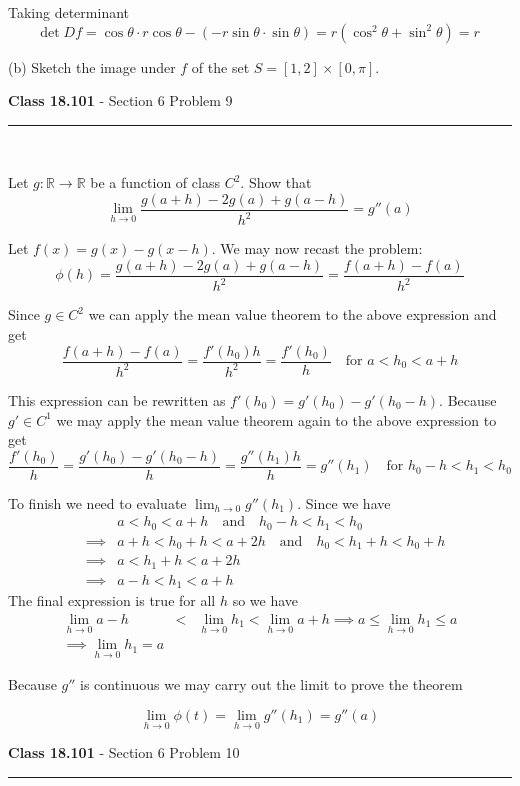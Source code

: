 \documentclass[11pt,reqno]{article}
\begin{document}
\noindent Taking determinant
\[ \text{det} \; D f = \cos \theta \cdot r \cos \theta - ( - r \sin \theta \cdot \sin \theta ) = r ( \cos^2 \theta + \sin^2 \theta) = r \]

\noindent (b) Sketch the image under $f$ of the set $S = [1,2] \times [0,\pi]$. \\ 


\begin{flushleft} 
\textbf{Class 18.101} - Section 6 Problem 9\\
\rule{500pt}{1pt}\\
\end{flushleft} 

\noindent Let $g: \mathbb{R} \to \mathbb{R}$ be a function of class $C^2$. Show that 
\[ \lim_{h \to 0} \frac{g(a + h) - 2 g(a) + g(a - h)}{h^2}  = g''(a)\]

\noindent Let $f(x) = g(x) - g(x - h)$. We may now recast the problem:
\[ \phi(h) = \frac{g(a + h) - 2 g(a) + g(a - h)}{h^2} = \frac{f(a+h) - f(a)}{h^2} \]

\noindent Since $g \in C^2$ we can apply the mean value theorem to the above expression and get
\[ \frac{f(a+h) - f(a)}{h^2} = \frac{f'(h_0) h}{h^2} = \frac{f'(h_0)}{h} \quad \text{for $a < h_0 < a + h$} \]

This expression can be rewritten as $f'(h_0) = g'(h_0) - g'(h_0 - h)$. Because $g' \in C^1$ we may apply the mean value theorem again to the above expression to get 
\[  \frac{f'(h_0)}{h} =  \frac{g'(h_0) - g'(h_0 - h)}{h} = \frac{g''(h_1) h}{h} = g''(h_1) \quad \text{for $h_0 - h < h_1 < h_0$ } \]

To finish we need to evaluate $\lim_{h \to 0} g''(h_1)$. Since we have
\begin{eqnarray*}
& & a < h_0 < a + h \quad \text{and} \quad h_0 - h < h_1 < h_0 \\
& \implies & a + h < h_0 + h < a + 2 h \quad \text{and} \quad h_0 < h_1 + h < h_0 + h \\
& \implies & a < h_1 + h < a + 2 h \\
& \implies & a - h < h_1 < a + h 
\end{eqnarray*}
The final expression is true for all $h$ so we have
\begin{eqnarray*}
\lim_{h \to 0} a - h & < & \lim_{h \to 0} h_1 < \lim_{h \to 0} a + h \implies a \le \lim_{h \to 0} h_1 \le  a\\
\implies \lim_{h \to 0} h_1 = a
\end{eqnarray*}

\noindent Because $g''$ is continuous we may carry out the limit to prove the theorem

\[ \lim_{h \to 0} \phi(t) = \lim_{h \to 0} g''(h_1) = g''(a) \]

\begin{flushleft} 
\textbf{Class 18.101} - Section 6 Problem 10\\
\rule{500pt}{1pt}\\
\end{flushleft} 
\end{document}
